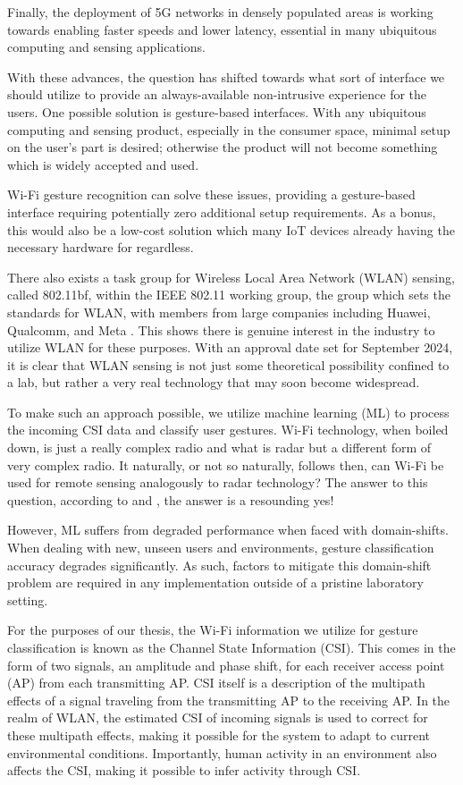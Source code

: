 Finally, the deployment of 5G networks in densely populated areas is working towards enabling faster speeds and lower latency, essential in many ubiquitous computing and sensing applications.

With these advances, the question has shifted towards what sort of interface we should utilize to provide an always-available non-intrusive experience for the users.
One possible solution is gesture-based interfaces.
With any ubiquitous computing and sensing product, especially in the consumer space, minimal setup on the user's part is desired; otherwise the product will not become something which is widely accepted and used.

Wi-Fi gesture recognition can solve these issues, providing a gesture-based interface requiring potentially zero additional setup requirements.
As a bonus, this would also be a low-cost solution which many IoT devices already having the necessary hardware for regardless.

There also exists a task group for Wireless Local Area Network (WLAN) sensing, called 802.11bf, within the IEEE 802.11 working group, the group which sets the standards for WLAN, with members from large companies including Huawei, Qualcomm, and Meta \cite{du2022overview}.
This shows there is genuine interest in the industry to utilize WLAN for these purposes.
With an approval date set for September 2024, it is clear that WLAN sensing is not just some theoretical possibility confined to a lab, but rather a very real technology that may soon become widespread.

To make such an approach possible, we utilize machine learning (ML) to process the incoming CSI data and classify user gestures.
Wi-Fi technology, when boiled down, is just a really complex radio and what is radar but a different form of very complex radio.
It naturally, or not so naturally, follows then, can Wi-Fi be used for remote sensing analogously to radar technology?
The answer to this question, according to \cite{adib2013see} and \cite{chetty2011through}, the answer is a resounding yes!

However, ML suffers from degraded performance when faced with domain-shifts.
When dealing with new, unseen users and environments, gesture classification accuracy degrades significantly. 
As such, factors to mitigate this domain-shift problem are required in any implementation outside of a pristine laboratory setting.

For the purposes of our thesis, the Wi-Fi information we utilize for gesture classification is known as the Channel State Information (CSI).
This comes in the form of two signals, an amplitude and phase shift, for each receiver access point (AP) from each transmitting AP.
CSI itself is a description of the multipath effects of a signal traveling from the transmitting AP to the receiving AP.
In the realm of WLAN, the estimated CSI of incoming signals is used to correct for these multipath effects, making it possible for the system to adapt to current environmental conditions.
Importantly, human activity in an environment also affects the CSI, making it possible to infer activity through CSI.

